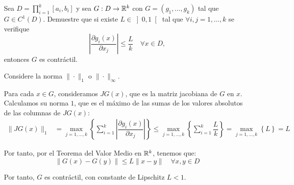 \begin{ejercicio}\label{ej:1.1.16}
    Sea $D = \prod\limits_{i=1}^k[a_i, b_i]$ y sea $G : D \to \mathbb{R}^k$ con $G = (g_1, \ldots, g_k)$ tal que $G \in C^1(D)$. Demuestre que si existe $L \in\left]0, 1\right[$ tal que $\forall i, j = 1, \ldots, k$ se verifique
    \begin{equation*}
        \left\lvert \dfrac{\partial g_i(x)}{\partial x_j} \right\rvert \leq \dfrac{L}{k}\quad \forall x \in D,
    \end{equation*}
    entonces $G$ es contráctil.
    \begin{observacion}
        Considere la norma $\| \cdot \|_1$ o $\| \cdot \|_\infty$.
    \end{observacion}

    Para cada $x\in G$, consideramos $JG(x)$, que es la matriz jacobiana de $G$ en $x$. Calculamos su norma $1$, que es el máximo de las sumas de los valores absolutos de las columnas de $JG(x)$:
    \begin{align*}
        \|JG(x)\|_1 &= \max_{j=1,\ldots,k}\left\{\sum_{i=1}^k\left|\dfrac{\partial g_i(x)}{\partial x_j}\right|\right\}\leq \max_{j=1,\ldots,k}\left\{\sum_{i=1}^k\dfrac{L}{k}\right\}=\max_{j=1,\ldots,k}\left\{L\right\}=L
    \end{align*}

    Por tanto, por el Teorema del Valor Medio en $\mathbb{R}^k$, tenemos que:
    \begin{equation*}
        \|G(x)-G(y)\| \leq L\|x-y\|\quad \forall x,y\in D
    \end{equation*}

    Por tanto, $G$ es contráctil, con constante de Lipschitz $L<1$.
\end{ejercicio}

